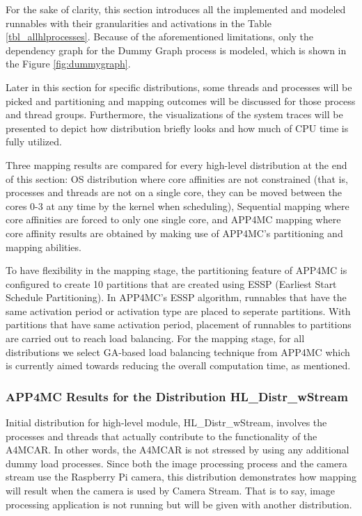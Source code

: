 For the sake of clarity, this section introduces all the implemented and modeled runnables with their granularities and activations in the Table \ref{tbl_allhlprocesses}. Because of the aforementioned limitations, only the dependency graph for the Dummy Graph process is modeled,  which is shown in the Figure \ref{fig:dummygraph}.

Later in this section for specific distributions, some threads and processes will be picked and partitioning and mapping outcomes will be discussed for those process and thread groups. Furthermore, the visualizations of the system traces will be presented to depict how distribution briefly looks and how much of CPU time is fully utilized.

Three mapping results are compared for every high-level distribution at the end of this section: OS distribution where core affinities are not constrained (that is, processes and threads are not on a single core, they can be moved between the cores 0-3 at any time by the kernel when scheduling), Sequential mapping where core affinities are forced to only one single core, and APP4MC mapping where core affinity results are obtained by making use of APP4MC's partitioning and mapping abilities. 

To have flexibility in the mapping stage, the partitioning feature of APP4MC is configured to create 10 partitions that are created using ESSP (Earliest Start Schedule Partitioning). In APP4MC's ESSP algorithm, runnables that have the same activation period or activation type are placed to seperate partitions. With partitions that have same activation period, placement of runnables to partitions are carried out to reach load balancing. For the mapping stage, for all distributions we select GA-based load balancing technique from APP4MC which is currently aimed towards reducing the overall computation time, as mentioned.

\allhlprocesses

\subsubsection{APP4MC Results for the Distribution HL{\_}Distr{\_}wStream}

Initial distribution for high-level module, HL{\_}Distr{\_}wStream, involves the processes and threads that actually contribute to the functionality of the A4MCAR. In other words, the A4MCAR is not stressed by using any additional dummy load processes. Since both the image processing process and the camera stream use the Raspberry Pi camera, this distribution demonstrates how mapping will result when the camera is used by Camera Stream. That is to say, image processing application is not running but will be given with another distribution. 

